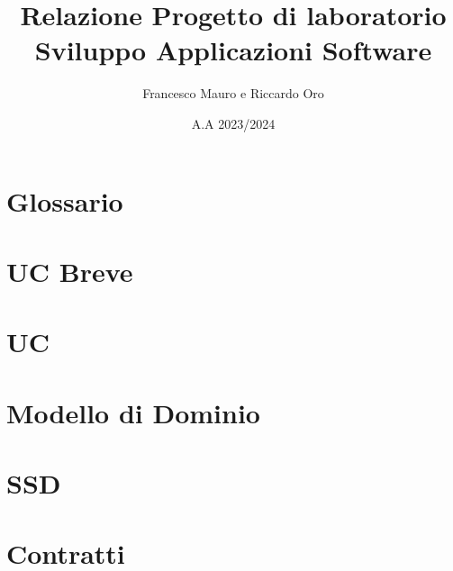 \documentclass[letterpaper]{report}
\title{Relazione Progetto di laboratorio\\ Sviluppo Applicazioni Software}
\author{Francesco Mauro e Riccardo Oro}
\date{A.A 2023/2024}
\begin{document}
\maketitle
\tableofcontents
\chapter{Glossario}

\chapter{UC Breve}

\chapter{UC}

\chapter{Modello di Dominio}

\chapter{SSD}

\chapter{Contratti}
\end{document}
